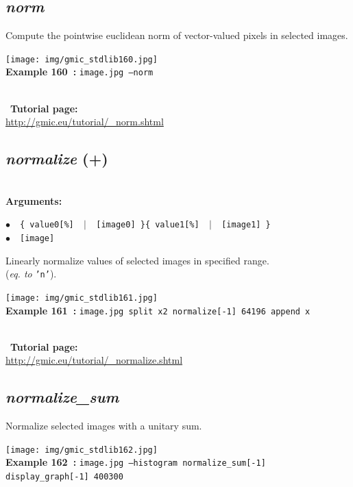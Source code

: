 \documentclass[a4paper,10.5pt,twoside]{book}
\def\comma{\discretionary{,}{}{,}}
\newcommand{\Cb}[1]{\textcolor{cb}{#1}}
\begin{document}
\subsection{\emph{norm} }\vspace*{-0.7em}
Compute the pointwise euclidean norm of vector-valued pixels in selected images.
\begin{center}\texttt{[image: img/gmic\_stdlib160.jpg]}\\
{\footnotesize \textbf{Example 160~:} \texttt{image.jpg --norm}}
\end{center}
~\\
~\textbf{Tutorial page: }\\\url{http://gmic.eu/tutorial/\_norm.shtml}


\subsection{\emph{normalize} (+)}\vspace*{-0.7em}
~\\\textbf{\Cb{Arguments: }}\begin{flushleft}
{\small \Cb{\hspace*{0.5cm}$\bullet$~~\texttt{\{ value0[\%] ~$|$~ [image0] \}{\comma}\{ value1[\%] ~$|$~ [image1] \}}}}~~~\\
{\small \Cb{\hspace*{0.5cm}$\bullet$~~\texttt{[image]}}}\end{flushleft}
Linearly normalize values of selected images in specified range.
~\\(\emph{eq. to} {\small \texttt{'n'}}).
\begin{center}\texttt{[image: img/gmic\_stdlib161.jpg]}\\
{\footnotesize \textbf{Example 161~:} \texttt{image.jpg split x{\comma}2 normalize[-1] 64{\comma}196 append x}}
\end{center}
~\\
~\textbf{Tutorial page: }\\\url{http://gmic.eu/tutorial/\_normalize.shtml}


\subsection{\emph{normalize\_sum} }\vspace*{-0.7em}
Normalize selected images with a unitary sum.
\begin{center}\texttt{[image: img/gmic\_stdlib162.jpg]}\\
{\footnotesize \textbf{Example 162~:} \texttt{image.jpg --histogram normalize\_sum[-1] display\_graph[-1] 400{\comma}300}}
\end{center}
\end{document}
